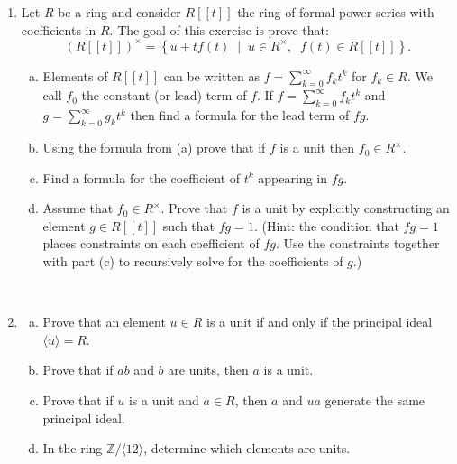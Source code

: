 \documentclass[12pt]{amsart}
\newcommand{\ZZ}{\mathbb{Z}}
\begin{document}
\begin{enumerate}
	 \item Let $R$ be a ring and consider $R[[t]]$ the ring of formal power series with coefficients in $R$. The goal of this exercise is prove that:
	 \[
	 \left(R[[t]]\right)^{\times} = \left\{ u + tf(t) \;\; \big| \;\; u \in R^{\times}, \;\; f(t) \in R[[t]] \right\}.
	 \]
	 \begin{enumerate}[(a)]
	 	\item Elements of $R[[t]]$ can be written as $f=\sum_{k=0}^{\infty} f_k t^k$ for $f_{k} \in R$. We call $f_0$ the constant (or lead) term of $f$. If $f=\sum_{k=0}^{\infty} f_k t^k$ and $g=\sum_{k=0}^{\infty} g_k t^k$ then find a formula for the lead term of $fg$. 
		\item Using the formula from (a) prove that if $f$ is a unit then $f_0 \in R^{\times}$. 
		\item Find a formula for the coefficient of $t^k$ appearing in $fg$. 
		\item Assume that $f_0 \in R^{\times}$. Prove that $f$ is a unit by explicitly constructing an element $g \in R[[t]]$ such that $fg = 1$. (Hint: the condition that $fg = 1$ places constraints on each coefficient of $fg$. Use the constraints together with part (c) to recursively solve for the coefficients of $g$.)	\end{enumerate}
	\ \\
	
	\item 
	\begin{enumerate}[(a)]
		\item Prove that an element $u \in R$ is a unit if and only if the principal ideal $\langle u \rangle = R$.
		\item Prove that if $ab$ and $b$ are units, then $a$ is a unit.
		\item Prove that if $u$ is a unit and $a \in R$, then $a$ and $ua$ generate the same principal ideal.
		\item In the ring $\ZZ/\langle 12 \rangle$, determine which elements are units.
	\end{enumerate}
	\ \\
	

\end{enumerate}
\end{document}
